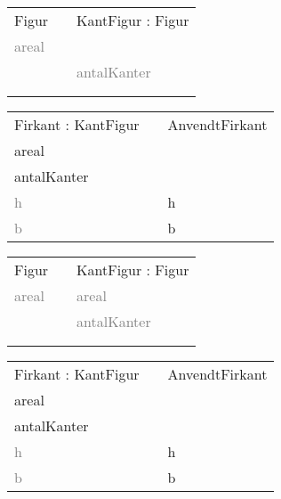 \begin{frame}[fragile] 
\begin{table}[h]
\begin{tabular}{|l|l|l|}
 \cline{1-1} \cline{3-3} 
Figur          &  & KantFigur : Figur    \\ \cline{1-1} \cline{3-3} 
\textcolor{gray}{areal} &  &                      \\
               &  &  \textcolor{gray}{antalKanter} \\
               &  &                      \\
               &  &                      \\ \cline{1-1} \cline{3-3} 
\end{tabular}
\end{table}
\begin{table}[h]
\begin{tabular}{|l|l|l|}
 \cline{1-1} \cline{3-3} 
Firkant : KantFigur &  & AnvendtFirkant       \\ \cline{1-1} \cline{3-3} 
areal      &  &                      \\
antalKanter     &  &                      \\
\textcolor{gray}{h}          &  & h               \\
\textcolor{gray}{b}          &  & b              \\ \cline{1-1} \cline{3-3} 
\end{tabular}
\end{table}
\end{frame}

\begin{frame}[fragile] 
\begin{table}[h]
\begin{tabular}{|l|l|l|}
 \cline{1-1} \cline{3-3} 
Figur          &  & KantFigur : Figur    \\ \cline{1-1} \cline{3-3} 
\textcolor{gray}{areal} &  & \textcolor{gray}{areal}       \\
               &  & \textcolor{gray}{antalKanter} \\
               &  &                      \\
               &  &                      \\ \cline{1-1} \cline{3-3} 
\end{tabular}
\end{table}
\begin{table}[h]
\begin{tabular}{|l|l|l|}
 \cline{1-1} \cline{3-3} 
Firkant : KantFigur &  & AnvendtFirkant       \\ \cline{1-1} \cline{3-3} 
areal               &  &                      \\
antalKanter         &  &                      \\
\textcolor{gray}{h}          &  & h                    \\
\textcolor{gray}{b}          &  & b                    \\ \cline{1-1} \cline{3-3} 
\end{tabular}
\end{table}
\end{frame}

